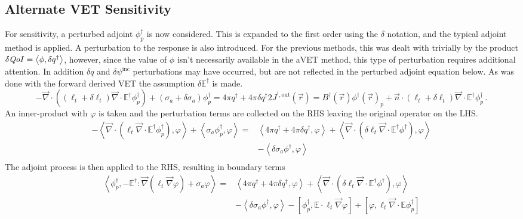 \documentclass[12pt]{report}
\newcommand{\vr}{\vec{r}}
\newcommand{\bra}{\left\langle}
\newcommand{\ket}{\right\rangle}
\newcommand{\sbra}{\left[}
\newcommand{\sket}{\right]}
\renewcommand{\div}{\vec{\nabla} \cdot}
\newcommand{\grad}{\vec{\nabla}}
\newcommand{\vn}{\vec{n}}
\newcommand{\Edd}{\mathbb{E}}
\newcommand{\BEdd}{B}
\newcommand{\siga}{\sigma_a}
\newcommand{\isigt}{\ell_t}
\newcommand{\scalResp}{q^\dag}
\newcommand{\qoi}{{\it QoI}\xspace}
\begin{document}
\subsection{Alternate VET Sensitivity}
For sensitivity, a perturbed adjoint $\phi^\dag_p$ is now considered. This is expanded to the first order using the $\delta$ notation, and the typical adjoint method is applied. A perturbation to the response is also introduced. For the previous methods, this was dealt with trivially by the product $\delta \qoi = \bra \phi , \delta q^\dag \ket$, however, since the value of $\phi$ isn't necessarily available in the aVET method, this type of perturbation requires additional attention. In addition $\delta q$ and $\delta \psi^{\text{inc}}$ perturbations may have occurred, but are not reflected in the perturbed adjoint equation below. As was done with the forward derived VET the assumption $\delta \Edd^\dag$ is made.
\begin{subequations}
\begin{equation}
- \div \left( (\isigt + \delta \isigt )\div \Edd^\dag \phi^\dag_p  \right)  +  (\siga + \delta \siga) \phi^\dag_p  =  4 \pi \scalResp + 4 \pi\delta \scalResp
\end{equation}
\begin{equation}
2 J^{^\dag,\text{out}}(\vr) = \BEdd^\dag(\vr) \phi^\dag(\vr)_p  + \vn \cdot (\isigt + \delta \isigt) \div \Edd^\dag  \phi^\dag_p  \,.
\end{equation}
\end{subequations}
An inner-product with $\varphi$ is taken and the perturbation terms are collected on the RHS leaving the original operator on the LHS.
\begin{equation}
\begin{split}
- \bra\div \left( \isigt \div \Edd^\dag \phi^\dag_p  \right), \varphi \ket + \bra \siga  \phi^\dag_p , \varphi \ket  =& \bra 4 \pi \scalResp + 4 \pi\delta \scalResp , \varphi \ket + \bra\div \left( \delta \isigt \div \Edd^\dag \phi^\dag  \right), \varphi \ket \\ 
&- \bra \delta \siga \phi^\dag , \varphi \ket \\
\end{split}
\end{equation}
The adjoint process is then applied to the RHS, resulting in boundary terms
\begin{equation}
\label{AltVetPertDeriv}
\begin{split}
 \bra  \phi^\dag_p , -\Edd^\dag : \grad \left( \isigt \grad \varphi \right) + \siga  \varphi \ket  =& \bra 4 \pi \scalResp + 4 \pi\delta \scalResp , \varphi \ket + \bra\div \left( \delta \isigt \div \Edd^\dag \phi^\dag  \right), \varphi \ket \\ 
&- \bra \delta \siga \phi^\dag , \varphi \ket - \sbra \phi^\dag_p, \Edd \cdot \isigt \grad \varphi \sket + \sbra \varphi, \isigt \div \Edd \phi^\dag_p \sket  \\
\end{split}
\end{equation}
\end{document}
